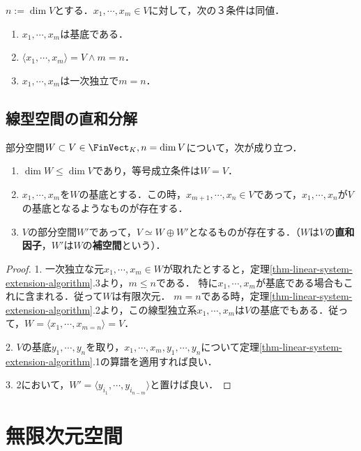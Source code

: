 \documentclass[uplatex, dvipdfmx]{jsreport}
\begin{document}
\begin{corollary}
    $n:=\dim V$とする．$x_1,\cdots,x_m\in V$に対して，次の３条件は同値．
    \begin{enumerate}
        \item $x_1,\cdots,x_m$は基底である．
        \item $\langle x_1,\cdots,x_m\rangle =V\land m=n$．
        \item $x_1,\cdots,x_m$は一次独立で$m=n$．
    \end{enumerate}
\end{corollary}

\subsection{線型空間の直和分解}

\begin{proposition}
    部分空間$W\subset V\in\FinVect_K, n=\dim  V$について，次が成り立つ．
    \begin{enumerate}
        \item $\dim W\le\dim V$であり，等号成立条件は$W=V$．
        \item $x_1,\cdots,x_m$を$W$の基底とする．この時，$x_{m+1},\cdots,x_n\in V$であって，$x_1,\cdots,x_n$が$V$の基底となるようなものが存在する．
        \item $V$の部分空間$W'$であって，$V\simeq W\oplus W'$となるものが存在する．（$W$は$V$の\textbf{直和因子}，$W'$は$W$の\textbf{補空間}という）．
    \end{enumerate}
\end{proposition}
\begin{proof}
    1. 一次独立な元$x_1,\cdots,x_m\in W$が取れたとすると，定理\ref{thm-linear-system-extension-algorithm}.3より，$m\le n$である．
    特に$x_1,\cdots,x_m$が基底である場合もこれに含まれる．従って$W$は有限次元．
    $m=n$である時，定理\ref{thm-linear-system-extension-algorithm}.2より，この線型独立系$x_1,\cdots,x_m$は$V$の基底でもある．従って，$W=\langle x_1,\cdots,x_{m=n}\rangle=V$．

    2. $V$の基底$y_1,\cdots,y_n$を取り，$x_1,\cdots,x_m,y_1,\cdots,y_n$について定理\ref{thm-linear-system-extension-algorithm}.1の算譜を適用すれば良い．

    3. 2において，$W'=\langle y_{i_1},\cdots,y_{i_{n-m}}\rangle$と置けば良い．
\end{proof}

\section{無限次元空間}
\end{document}
